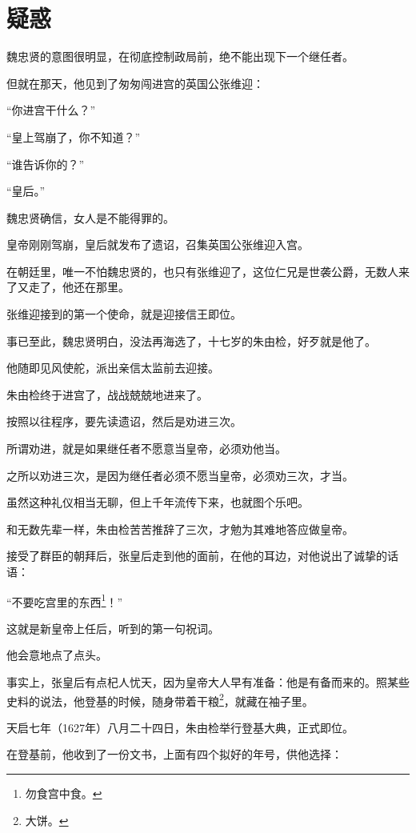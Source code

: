 \section{疑惑}
\ifnum{}
	\begin{multicols}{\theparacolNo}
		\fi
		魏忠贤的意图很明显，在彻底控制政局前，绝不能出现下一个继任者。

		但就在那天，他见到了匆匆闯进宫的英国公张维迎：

		“你进宫干什么？”

		“皇上驾崩了，你不知道？”

		“谁告诉你的？”

		“皇后。”

		魏忠贤确信，女人是不能得罪的。

		皇帝刚刚驾崩，皇后就发布了遗诏，召集英国公张维迎入宫。

		在朝廷里，唯一不怕魏忠贤的，也只有张维迎了，这位仁兄是世袭公爵，无数人来了又走了，他还在那里。

		张维迎接到的第一个使命，就是迎接信王即位。

		事已至此，魏忠贤明白，没法再海选了，十七岁的朱由检，好歹就是他了。

		他随即见风使舵，派出亲信太监前去迎接。

		朱由检终于进宫了，战战兢兢地进来了。

		按照以往程序，要先读遗诏，然后是劝进三次。

		所谓劝进，就是如果继任者不愿意当皇帝，必须劝他当。

		之所以劝进三次，是因为继任者必须不愿当皇帝，必须劝三次，才当。

		虽然这种礼仪相当无聊，但上千年流传下来，也就图个乐吧。

		和无数先辈一样，朱由检苦苦推辞了三次，才勉为其难地答应做皇帝。

		接受了群臣的朝拜后，张皇后走到他的面前，在他的耳边，对他说出了诚挚的话语：

		“不要吃宫里的东西\footnote{勿食宫中食。}！”

		这就是新皇帝上任后，听到的第一句祝词。

		他会意地点了点头。

		事实上，张皇后有点杞人忧天，因为皇帝大人早有准备：他是有备而来的。照某些史料的说法，他登基的时候，随身带着干粮\footnote{大饼。}，就藏在袖子里。

		天启七年（1627年）八月二十四日，朱由检举行登基大典，正式即位。

		在登基前，他收到了一份文书，上面有四个拟好的年号，供他选择：


\end{multicols}
